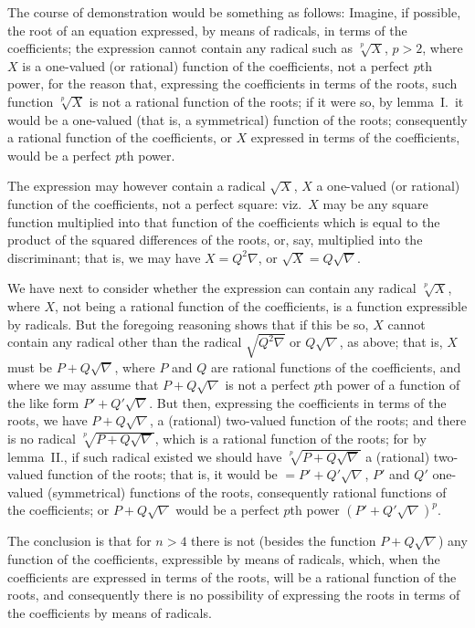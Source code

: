 \documentclass[11pt,a4paper]{article}
\begin{document}
The course of demonstration would be something as follows: Imagine, if
possible, the root of an equation expressed, by means of radicals, in terms of
the coefficients; the expression cannot contain any radical such as
$\sqrt[p]{X}$, $p > 2$, where $X$ is a one-valued (or rational) function of the
coefficients, not a perfect $p$th power, for the reason that, expressing the
coefficients in terms of the roots, such function $\sqrt[p]{X}$ is not a
rational function of the roots; if it were so, by lemma~I.\ it would be a
one-valued (that is, a symmetrical) function of the roots; consequently a
rational function of the coefficients, or $X$ expressed in terms of the
coefficients, would be a perfect $p$th power.

The expression may however contain a radical $\sqrt{X}$, $X$ a one-valued (or
rational) function of the coefficients, not a perfect square: viz.\ $X$ may be
any square function multiplied into that function of the coefficients which is
equal to the product of the squared differences of the roots, or, say,
multiplied into the discriminant; that is, we may have $X = Q^2\nabla$, or
$\sqrt{X} = Q\sqrt{\nabla}$.

We have next to consider whether the expression can contain any radical
$\sqrt[p]{X}$, where $X$, not being a rational function of the coefficients, is
a function expressible by radicals.  But the foregoing reasoning shows that if
this be so, $X$ cannot contain any radical other than the radical
$\sqrt{Q^2\nabla}$ or $Q\sqrt{\nabla}$, as above; that is, $X$ must be
$P + Q\sqrt{\nabla}$, where $P$ and $Q$ are rational functions of the
coefficients, and where we may assume that $P + Q\sqrt{\nabla}$ is not a
perfect $p$th power of a function of the like form $P' + Q'\sqrt{\nabla}$.
But then, expressing the coefficients in terms of the roots, we have
$P + Q\sqrt{\nabla}$, a (rational) two-valued function of the roots; and there
is no radical $\sqrt[p]{P + Q\sqrt{\nabla}}$, which is a rational function of
the roots; for by lemma~II., if such radical existed we should have
$\sqrt[p]{P + Q\sqrt{\nabla}}$ a (rational) two-valued function of the roots;
that is, it would be $= P' + Q'\sqrt{\nabla}$, $P'$ and $Q'$ one-valued
(symmetrical) functions of the roots, consequently rational functions of the
coefficients; or $P + Q\sqrt{\nabla}$ would be a perfect $p$th power
$(P' + Q'\sqrt{\nabla})^p$.

The conclusion is that for $n > 4$ there is not (besides the function
$P + Q\sqrt{\nabla}$) any function of the coefficients, expressible by means of
radicals, which, when the coefficients are expressed in terms of the roots,
will be a rational function of the roots, and consequently there is no
possibility of expressing the roots in terms of the coefficients by means of
radicals.
\end{document}
